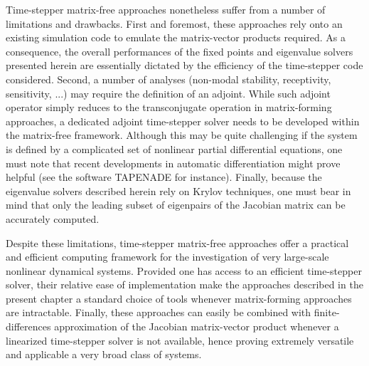 Time-stepper matrix-free approaches nonetheless suffer from a number of limitations and drawbacks. First and foremost, these approaches rely onto an existing simulation code to emulate the matrix-vector products required. As a consequence, the overall performances of the fixed points and eigenvalue solvers presented herein are essentially dictated by the efficiency of the time-stepper code considered. Second, a number of analyses (non-modal stability, receptivity, sensitivity, ...) may require the definition of an adjoint. While such adjoint operator simply reduces to the transconjugate operation in matrix-forming approaches, a dedicated adjoint time-stepper solver needs to be developed within the matrix-free framework. Although this may be quite challenging if the system is defined by a complicated set of nonlinear partial differential equations, one must note that recent developments in automatic differentiation might prove helpful (see the software TAPENADE \cite{TapenadeRef13} for instance). Finally, because the eigenvalue solvers described herein rely on Krylov techniques, one must bear in mind that only the leading subset of eigenpairs of the Jacobian matrix can be accurately computed.

Despite these limitations, time-stepper matrix-free approaches offer a practical and efficient computing framework for the investigation of very large-scale nonlinear dynamical systems. Provided one has access to an efficient time-stepper solver, their relative ease of implementation make the approaches described in the present chapter a standard choice of tools whenever matrix-forming approaches are intractable. Finally, these approaches can easily be combined with finite-differences approximation of the Jacobian matrix-vector product whenever a linearized time-stepper solver is not available, hence proving extremely versatile and applicable a very broad class of systems.
